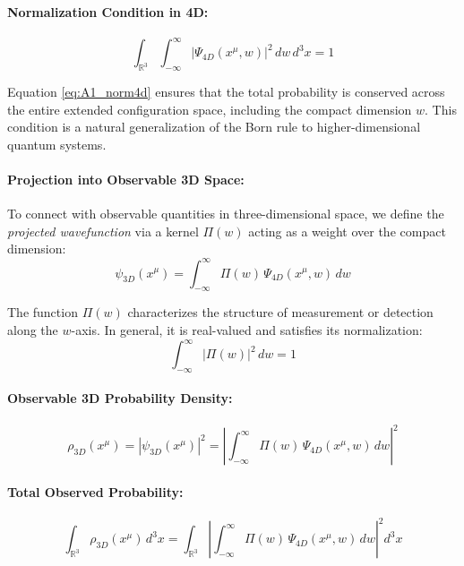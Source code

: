 \documentclass[12pt]{article}
\begin{document}
\noindent
\paragraph{Normalization Condition in 4D:}
\begin{equation}
\int_{\mathbb{R}^3} \int_{-\infty}^{\infty} \left| \Psi_{4D}(x^\mu, w) \right|^2 \, dw\, d^3x = 1
\label{eq:A1_norm4d}
\end{equation}

Equation \eqref{eq:A1_norm4d} ensures that the total probability is conserved across the entire extended configuration space, including the compact dimension \(w\). This condition is a natural generalization of the Born rule to higher-dimensional quantum systems.

\vspace{1em}
\noindent
\paragraph{Projection into Observable 3D Space:}

To connect with observable quantities in three-dimensional space, we define the \emph{projected wavefunction} via a kernel \(\Pi(w)\) acting as a weight over the compact dimension:
\begin{equation}
\psi_{3D}(x^\mu) = \int_{-\infty}^{\infty} \Pi(w)\, \Psi_{4D}(x^\mu, w) \, dw
\label{eq:A1_proj_def}
\end{equation}

The function \(\Pi(w)\) characterizes the structure of measurement or detection along the \(w\)-axis. In general, it is real-valued and satisfies its normalization:
\begin{equation}
\int_{-\infty}^{\infty} |\Pi(w)|^2 \, dw = 1
\label{eq:A1_proj_kernel_norm}
\end{equation}

\vspace{1em}
\noindent
\paragraph{Observable 3D Probability Density:}
\begin{equation}
\rho_{3D}(x^\mu) = \left| \psi_{3D}(x^\mu) \right|^2 = \left| \int_{-\infty}^{\infty} \Pi(w)\, \Psi_{4D}(x^\mu, w) \, dw \right|^2
\label{eq:A1_rho3d}
\end{equation}

\noindent
\paragraph{Total Observed Probability:}
\begin{equation}
\int_{\mathbb{R}^3} \rho_{3D}(x^\mu)\, d^3x = \int_{\mathbb{R}^3} \left| \int_{-\infty}^{\infty} \Pi(w)\, \Psi_{4D}(x^\mu, w) \, dw \right|^2 d^3x
\label{eq:A1_total_rho3d}
\end{equation}
\end{document}
